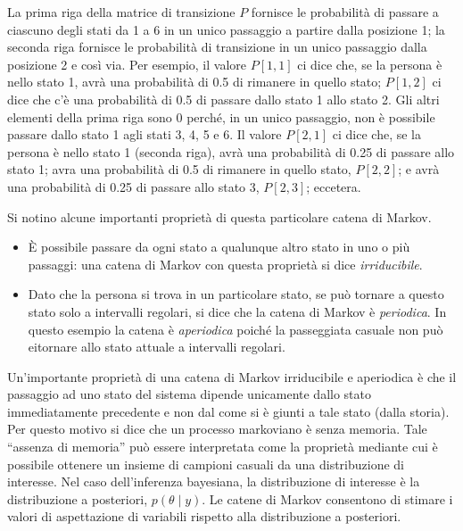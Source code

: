 \documentclass[
  10pt,
  italian,
  a4paper,
  extrafontsizes,onecolumn,openright
  ]{memoir}
\providecommand{\tightlist}{%
  \setlength{\itemsep}{0pt}\setlength{\parskip}{0pt}}
\begin{document}
\hfill\break

La prima riga della matrice di transizione \(P\) fornisce le probabilità di passare a ciascuno degli stati da 1 a 6 in un unico passaggio a partire dalla posizione 1; la seconda riga fornisce le probabilità di transizione in un unico passaggio dalla posizione 2 e così via. Per esempio, il valore \(P[1, 1]\) ci dice che, se la persona è nello stato 1, avrà una probabilità di 0.5 di rimanere in quello stato; \(P[1, 2]\) ci dice che c'è una probabilità di 0.5 di passare dallo stato 1 allo stato 2. Gli altri elementi della prima riga sono 0 perché, in un unico passaggio, non è possibile passare dallo stato 1 agli stati 3, 4, 5 e 6. Il valore \(P[2, 1]\) ci dice che, se la persona è nello stato 1 (seconda riga), avrà una probabilità di 0.25 di passare allo stato 1; avra una probabilità di 0.5 di rimanere in quello stato, \(P[2, 2]\); e avrà una probabilità di 0.25 di passare allo stato 3, \(P[2, 3]\); eccetera.

Si notino alcune importanti proprietà di questa particolare catena di Markov.

\begin{itemize}
\tightlist
\item
  È possibile passare da ogni stato a qualunque altro stato in uno o più passaggi: una catena di Markov con questa proprietà si dice \emph{irriducibile}.
\item
  Dato che la persona si trova in un particolare stato, se può tornare a questo stato solo a intervalli regolari, si dice che la catena di Markov è \emph{periodica}. In questo esempio la catena è \emph{aperiodica} poiché la passeggiata casuale non può eitornare allo stato attuale a intervalli regolari.
\end{itemize}

Un'importante proprietà di una catena di Markov irriducibile e aperiodica è che il passaggio ad uno stato del sistema dipende unicamente dallo stato immediatamente precedente e non dal come si è giunti a tale stato (dalla storia). Per questo motivo si dice che un processo markoviano è senza memoria. Tale ``assenza di memoria'' può essere interpretata come la proprietà mediante cui è possibile ottenere un insieme di campioni casuali da una distribuzione di interesse. Nel caso dell'inferenza bayesiana, la distribuzione di interesse è la distribuzione a posteriori, \(p(\theta \mid y)\). Le catene di Markov consentono di stimare i valori di aspettazione di variabili rispetto alla distribuzione a posteriori.
\end{document}
